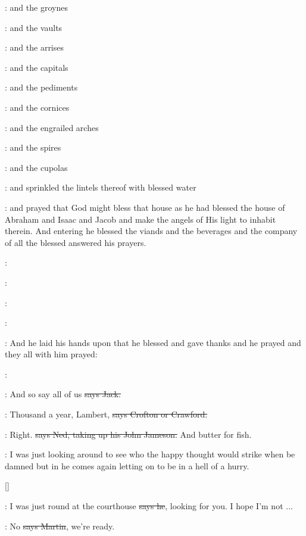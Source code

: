 :
and the groynes 

:
and the vaults 

:
and the arrises 

:
and the capitals 

:
and the pediments 

:
and the cornices 

:
and the engrailed arches 

:
and the spires 

:
and the cupolas 

:
and sprinkled the lintels thereof with blessed water

:
and prayed that God might bless that house
as he had blessed the house of Abraham and Isaac and Jacob
and make the angels of His light to inhabit therein.
And entering
he blessed the viands
and the beverages
and the company of
all the blessed
answered his prayers.

:

:

:

:

:
And he laid his hands upon that he blessed
and gave thanks
and he prayed
and they all with him prayed:

\All:

\power:
And so say all of us
\sout{says Jack.}

\crofton:
Thousand a year,
Lambert,
\sout{says Crofton or Crawford.}

\lambert:
Right.
\sout{says Ned,
taking up his John Jameson.}
And butter for fish.

\Nq:
I was just looking around to see who the happy thought would strike
when be damned but in he comes again
letting on to be in a hell of a hurry.

[]

\Bloom:
I was just round at the courthouse
\sout{says he},
looking for you.
I hope I'm not ...

\cunningham:
No
\sout{says Martin},
we're ready.

